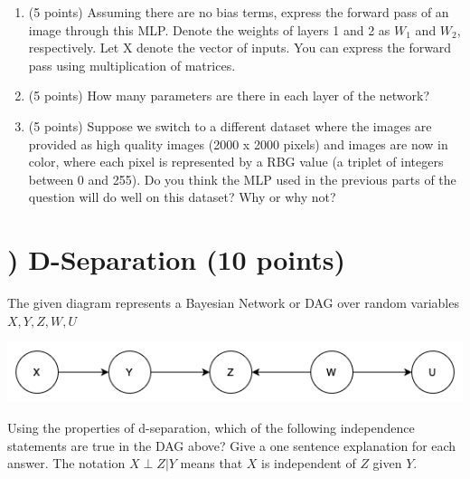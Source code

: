 \documentclass[11pt]{article}
\newcounter{QuestionCounter}
\newcounter{SubQuestionCounter}[QuestionCounter]
\newcommand{\newquestion}{\stepcounter{QuestionCounter}\setcounter{SubQuestionCounter}{1}\newpage}
\begin{document}
\begin{enumerate}[{(a)}]

\item (5 points) Assuming there are no bias terms, express the forward pass of an image through this MLP. Denote the weights of layers 1 and 2 as $W_1$ and $W_2$, respectively. Let X denote the vector of inputs. You can express the forward pass using multiplication of matrices. 


\begin{answertext}{9cm}{}
\end{answertext} 

\item (5 points) How many parameters are there in each layer of the network? 


\begin{answertext}{9cm}{}
  
\end{answertext} 

\item (5 points) Suppose we switch to a different dataset where the images are provided as high quality images (2000 x 2000 pixels) and images are now in color, where each pixel is represented by a RBG value (a triplet of integers between 0 and 255). Do you think the MLP used in the previous parts of the question will do well on this dataset? Why or why not?

\begin{answertext}{10cm}{}
    
  
  
\end{answertext} 

\end{enumerate}

\newpage
\newquestion
\section*{) D-Separation (10 points)}

The given diagram represents a Bayesian Network or DAG over random variables $X, Y, Z, W, U$

\includegraphics[scale = 0.75]{dsep.png}

Using the properties of d-separation, which of the following independence statements are true in the DAG above?
Give a one sentence explanation for each answer. The notation $X \perp Z | Y$ means that $X$ is independent of $Z$ given $Y$.
\end{document}
